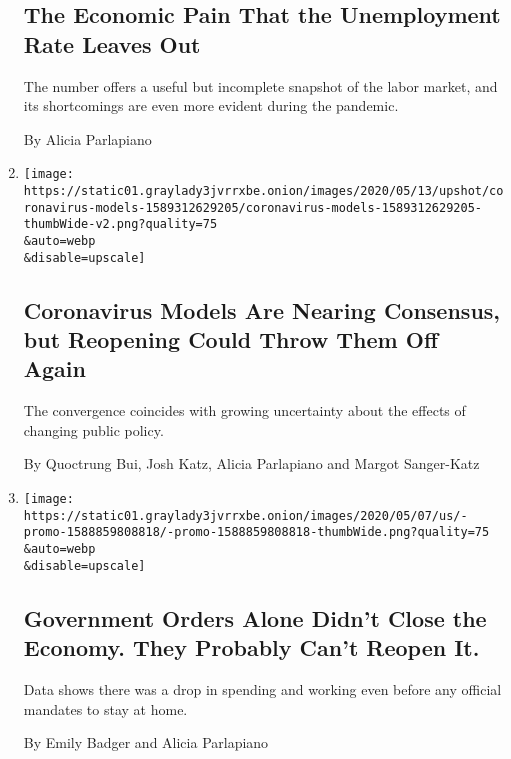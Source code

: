 \begin{enumerate}
  \hypertarget{the-economic-pain-that-the-unemployment-rate-leaves-out}{%
  \subsection{The Economic Pain That the Unemployment Rate Leaves
  Out}\label{the-economic-pain-that-the-unemployment-rate-leaves-out}}

  The number offers a useful but incomplete snapshot of the labor
  market, and its shortcomings are even more evident during the
  pandemic.

  By Alicia Parlapiano
\item
  \href{/interactive/2020/05/12/upshot/coronavirus-models.html}{}

  \texttt{[image: https://static01.graylady3jvrrxbe.onion/images/2020/05/13/upshot/coronavirus-models-1589312629205/coronavirus-models-1589312629205-thumbWide-v2.png?quality=75\\\&auto=webp\\\&disable=upscale]}

  \hypertarget{coronavirus-models-are-nearing-consensus-but-reopening-could-throw-them-off-again}{%
  \subsection{Coronavirus Models Are Nearing Consensus, but Reopening
  Could Throw Them Off
  Again}\label{coronavirus-models-are-nearing-consensus-but-reopening-could-throw-them-off-again}}

  The convergence coincides with growing uncertainty about the effects
  of changing public policy.

  By Quoctrung Bui, Josh Katz, Alicia Parlapiano and Margot Sanger-Katz
\item
  \href{/2020/05/07/upshot/pandemic-economy-government-orders.html}{}

  \texttt{[image: https://static01.graylady3jvrrxbe.onion/images/2020/05/07/us/-promo-1588859808818/-promo-1588859808818-thumbWide.png?quality=75\\\&auto=webp\\\&disable=upscale]}

  \hypertarget{government-orders-alone-didnt-close-the-economy-they-probably-cant-reopen-it}{%
  \subsection{Government Orders Alone Didn't Close the Economy. They
  Probably Can't Reopen
  It.}\label{government-orders-alone-didnt-close-the-economy-they-probably-cant-reopen-it}}

  Data shows there was a drop in spending and working even before any
  official mandates to stay at home.

  By Emily Badger and Alicia Parlapiano
\end{enumerate}

